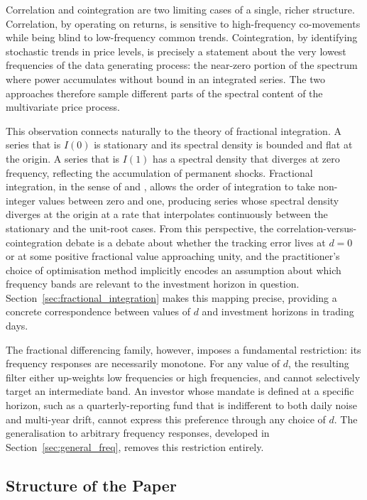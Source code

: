 \documentclass[12pt,a4paper]{article}
\begin{document}
Correlation and cointegration are two limiting cases of a single, richer
structure. Correlation, by
operating on returns, is sensitive to high-frequency co-movements while
being blind to low-frequency common trends. Cointegration, by identifying
stochastic trends in price levels, is precisely a statement about the
very lowest frequencies of the data generating process: the near-zero
portion of the spectrum where power accumulates without bound in an
integrated series. The two approaches therefore sample different parts of
the spectral content of the multivariate price process.

This observation connects naturally to the theory of fractional
integration. A series that is $I(0)$ is stationary and its spectral
density is bounded and flat at the origin. A series that is $I(1)$ has a
spectral density that diverges at zero frequency, reflecting the
accumulation of permanent shocks. Fractional integration, in the sense
of \citet{GrangerJoyeux1980} and \citet{Hosking1981}, allows the order
of integration to take non-integer values between zero and one, producing
series whose spectral density diverges at the origin at a rate that
interpolates continuously between the stationary and the unit-root cases.
From this perspective, the correlation-versus-cointegration debate is a
debate about whether the tracking error lives at $d = 0$ or at some
positive fractional value approaching unity, and the practitioner's
choice of optimisation method implicitly encodes an assumption about
which frequency bands are relevant to the investment horizon in question.
Section~\ref{sec:fractional_integration} makes this mapping precise,
providing a concrete correspondence between values of $d$ and investment
horizons in trading days.

The fractional differencing family, however, imposes a fundamental
restriction: its frequency responses are necessarily monotone. For any
value of $d$, the resulting filter either up-weights low frequencies or
high frequencies, and cannot selectively target an intermediate band.
An investor whose mandate is defined at a specific horizon, such as a
quarterly-reporting fund that is indifferent to both daily noise and
multi-year drift, cannot express this preference through any choice of
$d$. The generalisation to arbitrary frequency responses, developed in
Section~\ref{sec:general_freq}, removes this restriction
entirely.

\subsection{Structure of the Paper}
\label{sec:structure}
\end{document}
